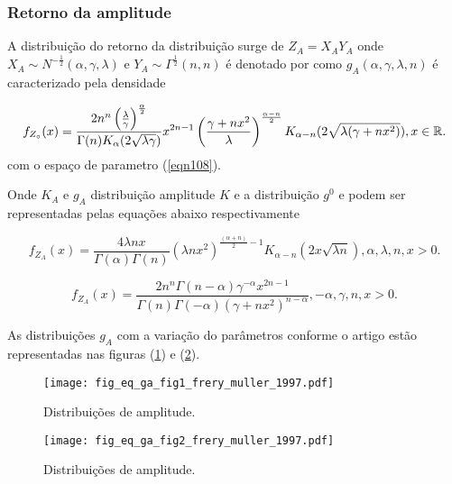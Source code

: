 \subsubsection{Retorno da amplitude}

A distribuição do retorno da distribuição surge de $Z_{A}=X_{A}Y_{A}$ onde $X_{A}\sim N^{-\frac{1}{2}}(\alpha,\gamma,\lambda)$  e $Y_{A}\sim\Gamma^{\frac{1}{2}}(n,n)$ é denotado por como $g_{A}(\alpha,\gamma,\lambda,n)$ é caracterizado pela densidade  

\begin{equation}\label{eqn111}
	f_{Z_{\circ}}(x)=\frac{2n^n\left(\frac{\lambda}{\gamma}\right)^{\frac{\alpha}{2}}}{\Gamma(n)K_{\alpha}(2\sqrt{\lambda\gamma})}x^{2n-1}\left(\frac{\gamma+nx^2}{\lambda}\right)^{\frac{\alpha-n}{2}}K_{\alpha-n}(2\sqrt{\lambda(\gamma+nx^2)}), x\in\mathbb{R}. \\
\end{equation}
com o espaço de parametro (\ref{eqn108}).

Onde $K_{A}$ e $g_{A}$  distribuição amplitude $K$ e a distribuição $g^0$ e podem ser representadas pelas equações abaixo respectivamente

\begin{equation}\label{eqn112}
	f_{Z_{A}}(x)= \frac{4\lambda n x}{\Gamma(\alpha)\Gamma(n)}(\lambda n x^2)^{\frac{(\alpha+n)}{2}-1} K_{\alpha-n}(2x\sqrt{\lambda n}), \alpha,\lambda,n, x>0. 
\end{equation}

\begin{equation}\label{eqn113}
	f_{Z_{A}}(x)= \frac{2n^n\Gamma(n-\alpha)\gamma^{-\alpha}x^{2n-1}}{\Gamma(n)\Gamma(-\alpha)(\gamma+nx^2)^{n-\alpha}}, -\alpha,\gamma,n, x>0. 
\end{equation}


As distribuições $g_A$ com a variação do parâmetros conforme o artigo estão representadas nas figuras (\ref{fig11}) e (\ref{fig12}).


\begin{figure}[!htb]
\centering
\texttt{[image: fig\_eq\_ga\_fig1\_frery\_muller\_1997.pdf]}
	\caption{Distribuições de amplitude.}
\label{fig11}
\end{figure}

\begin{figure}[!htb]
\centering
\texttt{[image: fig\_eq\_ga\_fig2\_frery\_muller\_1997.pdf]}
	\caption{Distribuições de amplitude.}
\label{fig12}
\end{figure}

